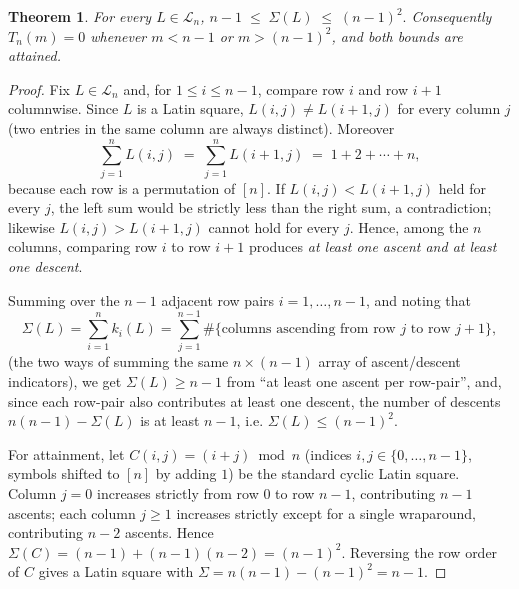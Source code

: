 \documentclass[10pt,a4paper]{amsart}
\newtheorem{theorem}{Theorem}
\begin{document}
\begin{theorem}\label{thm:bounds}
For every $L\in\mathcal L_n$, $n-1 \;\le\; \Sigma(L) \;\le\; (n-1)^2 .$
Consequently $T_n(m)=0$ whenever $m<n-1$ or $m>(n-1)^2$, and both bounds are attained.
\end{theorem}

\begin{proof}
Fix $L\in\mathcal L_n$ and, for $1\le i\le n-1$, compare row $i$ and row $i+1$ columnwise. Since $L$ is a Latin square, $L(i,j)\ne L(i+1,j)$ for every column $j$ (two entries in the same column are always distinct). Moreover
\[
\sum_{j=1}^n L(i,j) \;=\; \sum_{j=1}^n L(i+1,j) \;=\; 1+2+\cdots+n,
\]
because each row is a permutation of $[n]$. If $L(i,j)<L(i+1,j)$ held for every $j$, the left sum would be strictly less than the right sum, a contradiction; likewise $L(i,j)>L(i+1,j)$ cannot hold for every $j$. Hence, among the $n$ columns, comparing row $i$ to row $i+1$ produces \emph{at least one ascent and at least one descent}.

Summing over the $n-1$ adjacent row pairs $i=1,\dots,n-1$, and noting that
\[
\Sigma(L)=\sum_{i=1}^n k_i(L)=\sum_{j=1}^{n-1}\#\{\text{columns ascending from row }j\text{ to row }j+1\},
\]
(the two ways of summing the same $n\times(n-1)$ array of ascent/descent indicators), we get $\Sigma(L)\ge n-1$ from ``at least one ascent per row-pair'', and, since each row-pair also contributes at least one descent, the number of descents $n(n-1)-\Sigma(L)$ is at least $n-1$, i.e. $\Sigma(L)\le (n-1)^2$.

For attainment, let $C(i,j)=(i+j)\bmod n$ (indices $i,j\in\{0,\dots,n-1\}$, symbols shifted to $[n]$ by adding $1$) be the standard cyclic Latin square. Column $j=0$ increases strictly from row $0$ to row $n-1$, contributing $n-1$ ascents; each column $j\ge 1$ increases strictly except for a single wraparound, contributing $n-2$ ascents. Hence $\Sigma(C)=(n-1)+(n-1)(n-2)=(n-1)^2$. Reversing the row order of $C$ gives a Latin square with $\Sigma=n(n-1)-(n-1)^2=n-1$.
\end{proof}
\end{document}
